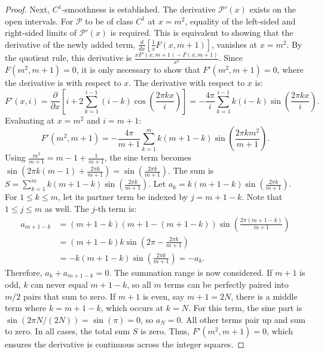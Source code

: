 \documentclass[11pt,a4paper]{amsart}
\newcommand{\Px}{\mathcal{P}}
\theoremstyle{plain}
\theoremstyle{definition}
\begin{document}
\begin{proof}
Next, $C^1$-smoothness is established.
The derivative $\Px'(x)$ exists on the open intervals. For $\Px$ to be of class $C^1$ at $x=m^2$, equality of the left-sided and right-sided limits of $\Px'(x)$ is required.
This is equivalent to showing that the derivative of the newly added term, $\frac{d}{dx}\left[\frac{1}{x}F(x, m+1)\right]$, vanishes at $x=m^2$.
By the quotient rule, this derivative is $\frac{x F'(x, m+1) - F(x, m+1)}{x^2}$.
Since $F(m^2, m+1)=0$, it is only necessary to show that $F'(m^2, m+1)=0$, where the derivative is with respect to $x$.
The derivative with respect to $x$ is:
\[ F'(x, i) = \frac{\partial}{\partial x}\left[i+2\sum_{k=1}^{i-1}(i-k)\cos\left(\frac{2\pi k x}{i}\right)\right] = -\frac{4\pi}{i}\sum_{k=1}^{i-1}k(i-k)\sin\left(\frac{2\pi k x}{i}\right).
\]
Evaluating at $x=m^2$ and $i=m+1$:
\[ F'(m^2, m+1) = -\frac{4\pi}{m+1}\sum_{k=1}^{m}k(m+1-k)\sin\left(\frac{2\pi k m^2}{m+1}\right).
\]
Using $\frac{m^2}{m+1} = m-1 + \frac{1}{m+1}$, the sine term becomes $\sin\left(2\pi k(m-1) + \frac{2\pi k}{m+1}\right) = \sin\left(\frac{2\pi k}{m+1}\right)$.
The sum is $S = \sum_{k=1}^{m}k(m+1-k)\sin\left(\frac{2\pi k}{m+1}\right)$. Let $a_k = k(m+1-k)\sin\left(\frac{2\pi k}{m+1}\right)$.
For $1 \le k \le m$, let its partner term be indexed by $j = m+1-k$.
Note that $1 \le j \le m$ as well. The $j$-th term is:
\begin{align*} a_{m+1-k} &= (m+1-k)(m+1-(m+1-k))\sin\left(\frac{2\pi (m+1-k)}{m+1}\right) \\ &= (m+1-k)k\sin\left(2\pi - \frac{2\pi k}{m+1}\right) \\ &= -k(m+1-k)\sin\left(\frac{2\pi k}{m+1}\right) = -a_k.
\end{align*}
Therefore, $a_k + a_{m+1-k} = 0$. The summation range is now considered.
If $m+1$ is odd, $k$ can never equal $m+1-k$, so all $m$ terms can be perfectly paired into $m/2$ pairs that sum to zero.
If $m+1$ is even, say $m+1=2N$, there is a middle term where $k=m+1-k$, which occurs at $k=N$.
For this term, the sine part is $\sin(2\pi N / (2N)) = \sin(\pi) = 0$, so $a_N=0$.
All other terms pair up and sum to zero. In all cases, the total sum $S$ is zero.
Thus, $F'(m^2, m+1) = 0$, which ensures the derivative is continuous across the integer squares.
\end{proof}
\end{document}
